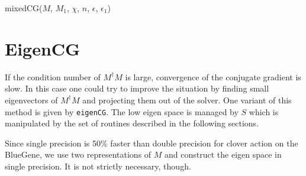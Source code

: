 \documentclass[oneside,openright]{report}
\newcommand{\DontPrintSemicolon}{\dontprintsemicolon}
\begin{document}
\begin{function}
\DontPrintSemicolon
{}
\caption{mixedCG($M$, $M_1$, $\chi$, $n$, $\epsilon$, $\epsilon_1$)}
\end{function}
\section{EigenCG}
If the condition number of $M^\dagger M$ is large, convergence of the conjugate gradient is slow. In this case one could try to improve the situation by finding small eigenvectors of $M^\dagger M$ and projecting them out of the solver. One variant of this method is given by \texttt{eigenCG}. The low eigen space is managed by $S$ which is manipulated by the set of routines described in the following sections.

Since single precision is 50\% faster than double precision for clover action on the BlueGene,
we use two representations of $M$ and construct the eigen space in single precision. 
It is not strictly necessary, though.
\end{document}

